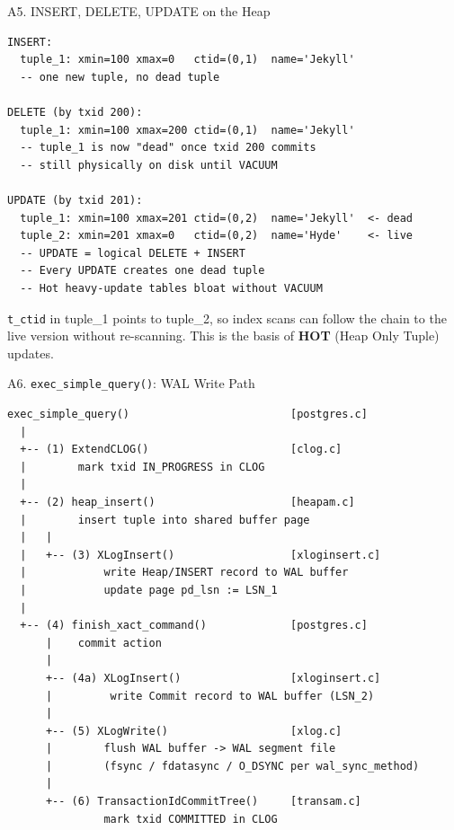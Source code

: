 \documentclass[aspectratio=169,10pt]{beamer}
\begin{document}
\begin{frame}[fragile]{A5. INSERT, DELETE, UPDATE on the Heap}

\begin{lstlisting}[style=ascii]
INSERT:
  tuple_1: xmin=100 xmax=0   ctid=(0,1)  name='Jekyll'
  -- one new tuple, no dead tuple

DELETE (by txid 200):
  tuple_1: xmin=100 xmax=200 ctid=(0,1)  name='Jekyll'
  -- tuple_1 is now "dead" once txid 200 commits
  -- still physically on disk until VACUUM

UPDATE (by txid 201):
  tuple_1: xmin=100 xmax=201 ctid=(0,2)  name='Jekyll'  <- dead
  tuple_2: xmin=201 xmax=0   ctid=(0,2)  name='Hyde'    <- live
  -- UPDATE = logical DELETE + INSERT
  -- Every UPDATE creates one dead tuple
  -- Hot heavy-update tables bloat without VACUUM
\end{lstlisting}

  {\small \texttt{t\_ctid} in tuple\_1 points to tuple\_2, so index scans can
  follow the chain to the live version without re-scanning.
  This is the basis of \textbf{HOT} (Heap Only Tuple) updates.}
\end{frame}

\begin{frame}[fragile]{A6. \texttt{exec\_simple\_query()}: WAL Write Path}

\begin{lstlisting}[style=ascii]
exec_simple_query()                         [postgres.c]
  |
  +-- (1) ExtendCLOG()                      [clog.c]
  |        mark txid IN_PROGRESS in CLOG
  |
  +-- (2) heap_insert()                     [heapam.c]
  |        insert tuple into shared buffer page
  |   |
  |   +-- (3) XLogInsert()                  [xloginsert.c]
  |            write Heap/INSERT record to WAL buffer
  |            update page pd_lsn := LSN_1
  |
  +-- (4) finish_xact_command()             [postgres.c]
      |    commit action
      |
      +-- (4a) XLogInsert()                 [xloginsert.c]
      |         write Commit record to WAL buffer (LSN_2)
      |
      +-- (5) XLogWrite()                   [xlog.c]
      |        flush WAL buffer -> WAL segment file
      |        (fsync / fdatasync / O_DSYNC per wal_sync_method)
      |
      +-- (6) TransactionIdCommitTree()     [transam.c]
               mark txid COMMITTED in CLOG
\end{lstlisting}

\end{frame}
\end{document}
